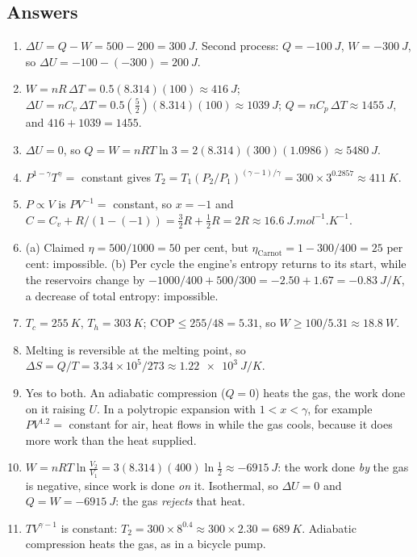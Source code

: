 \subsection*{Answers}
{\small
\begin{enumerate}[itemsep=2pt]
\item $\Delta U=Q-W=500-200=\SI{300}{J}$. Second process: $Q=\SI{-100}{J}$, $W=\SI{-300}{J}$, so
      $\Delta U=-100-(-300)=\SI{+200}{J}$.
\item $W=nR\,\Delta T=0.5(8.314)(100)\approx\SI{416}{J}$; $\Delta U=nC_v\,\Delta T=0.5(\tfrac52)(8.314)(100)
      \approx\SI{1039}{J}$; $Q=nC_p\,\Delta T\approx\SI{1455}{J}$, and $416+1039=1455$.
\item $\Delta U=0$, so $Q=W=nRT\ln3=2(8.314)(300)(1.0986)\approx\SI{5480}{J}$.
\item $P^{1-\gamma}T^\gamma=$ constant gives $T_2=T_1(P_2/P_1)^{(\gamma-1)/\gamma}=300\times3^{0.2857}
      \approx\SI{411}{K}$.
\item $P\propto V$ is $PV^{-1}=$ constant, so $x=-1$ and $C=C_v+R/(1-(-1))=\tfrac32R+\tfrac12R=2R
      \approx\SI{16.6}{J.mol^{-1}.K^{-1}}$.
\item (a) Claimed $\eta=500/1000=50$ per cent, but $\eta_{\text{Carnot}}=1-300/400=25$ per cent: impossible.
      (b) Per cycle the engine's entropy returns to its start, while the reservoirs change by
      $-1000/400+500/300=-2.50+1.67=\SI{-0.83}{J/K}$, a decrease of total entropy: impossible.
\item $T_c=\SI{255}{K}$, $T_h=\SI{303}{K}$; $\text{COP}\le255/48=5.31$, so $W\ge100/5.31\approx\SI{18.8}{W}$.
\item Melting is reversible at the melting point, so $\Delta S=Q/T=3.34\times10^5/273\approx\SI{1.22e3}{J/K}$.
\item Yes to both. An adiabatic compression ($Q=0$) heats the gas, the work done on it raising $U$. In a
      polytropic expansion with $1<x<\gamma$, for example $PV^{1.2}=$ constant for air, heat flows in while the
      gas cools, because it does more work than the heat supplied.
\item $W = nRT\ln\tfrac{V_2}{V_1} = 3(8.314)(400)\ln\tfrac12 \approx \SI{-6915}{J}$: the work done
      \emph{by} the gas is negative, since work is done \emph{on} it. Isothermal, so $\Delta U = 0$ and
      $Q = W = \SI{-6915}{J}$: the gas \emph{rejects} that heat.
\item $TV^{\gamma-1}$ is constant: $T_2 = 300\times8^{0.4} \approx 300\times2.30 = \SI{689}{K}$.
      Adiabatic compression heats the gas, as in a bicycle pump.

\end{enumerate}}

